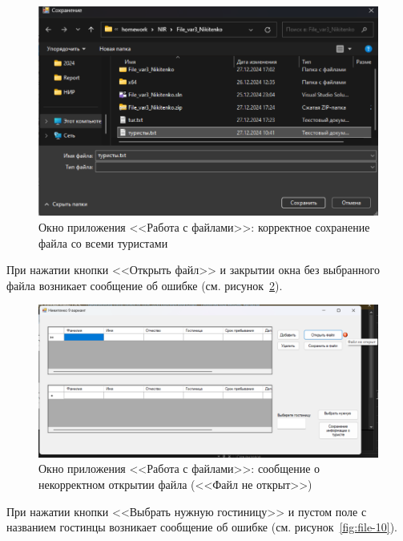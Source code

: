 \documentclass[bachelor, och, pract, times]{SCWorks}
\begin{document}
\begin{figure}[H]
    \centering
    \includegraphics[scale=0.45]{Скрины/Снимок экрана 2025-01-05 142525.png}
    \caption{Окно приложения <<Работа с файлами>>: корректное сохранение файла со всеми туристами}\label{fig:file-08}
\end{figure}

При нажатии кнопки <<Открыть файл>> и закрытии окна без выбранного файла возникает сообщение об ошибке (см. рисунок~\ref{fig:file-09}).

\begin{figure}[H]
    \centering
    \includegraphics[scale=0.45]{Скрины/Снимок экрана 2025-01-05 142621.png}
    \caption{Окно приложения <<Работа с файлами>>: сообщение о некорректном открытии файла (<<Файл не открыт>>)}\label{fig:file-09}
\end{figure}

При нажатии кнопки <<Выбрать нужную гостиницу>> и пустом поле с названием гостинцы возникает сообщение об ошибке (см. рисунок~\ref{fig:file-10}).
\end{document}

